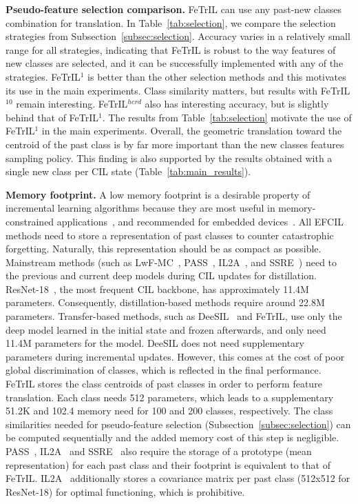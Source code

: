 \documentclass[10pt,twocolumn,letterpaper]{article}
\makeatletter
\newcommand{\ourmodel}{FeTrIL\@\xspace}
\newcommand{\ourmodelNospace}{FeTrIL}
\makeatother
\begin{document}
\textbf{Pseudo-feature selection comparison.}
\ourmodel can use any past-new classes combination for translation.
In Table~\ref{tab:selection}, we compare the selection strategies from Subsection~\ref{subsec:selection}.
Accuracy varies in a relatively small range for all strategies, indicating that \ourmodel is robust to the way features of new classes are selected, and it can be successfully implemented with any of the strategies. 
\ourmodelNospace$^{1}$ is better than the other selection methods and this motivates its use in the main experiments.
Class similarity matters, but results with \ourmodelNospace$^{10}$ remain interesting.
\ourmodelNospace$^{herd}$ also has interesting accuracy, but is slightly behind that of \ourmodelNospace$^{1}$.
The results from Table~\ref{tab:selection} motivate the use of \ourmodelNospace$^{1}$ in the main experiments.
Overall, the geometric translation toward the centroid of the past class is by far more important than the new classes features sampling policy.
This finding is also supported by the results obtained with a single new class per CIL state (Table~\ref{tab:main_results}).


\textbf{Memory footprint.} 
A low memory footprint is a desirable property of incremental learning algorithms because they are most useful in memory-constrained applications~\cite{masana2021_study,ravaglia2021tinyml,rebuffi2017_icarl}, and recommended for embedded devices~\cite{hayes2022online}.
All EFCIL methods need to store a representation of past classes to counter catastrophic forgetting. 
Naturally, this representation should be as compact as possible. 
Mainstream methods (such as LwF-MC~\cite{li2016_lwf}, PASS~\cite{zhu2021pass}, IL2A~\cite{zhu2021pass}, and SSRE~\cite{zhu2022self}) need to the previous and current deep models during CIL updates for distillation.
ResNet-18~\cite{he2016_resnet}, the most frequent CIL backbone, has approximately 11.4M parameters. 
Consequently, distillation-based methods require around 22.8M parameters.
Transfer-based methods, such as DeeSIL~\cite{belouadah2018_deesil} and \ourmodel, use only the deep model learned in the initial state and frozen afterwards, and only need 11.4M parameters for the model.
DeeSIL does not need supplementary parameters during incremental updates.
However, this comes at the cost of poor global discrimination of classes, which is reflected in the final performance. 
\ourmodel stores the class centroids of past classes in order to perform feature translation.
Each class needs 512 parameters, which leads to a supplementary 51.2K and 102.4 memory need for 100 and 200 classes, respectively.
The class similarities needed for pseudo-feature selection (Subsection~\ref{subsec:selection}) can be computed sequentially and the added memory cost of this step is negligible.
PASS~\cite{zhu2021pass}, IL2A~\cite{zhu2021class} and SSRE~\cite{zhu2022self} also require the storage of a prototype (mean representation) for each past class and their footprint is equivalent to that of \ourmodel. 
IL2A~\cite{zhu2021class} additionally stores a covariance matrix per past class (512x512 for ResNet-18) for optimal functioning, which is prohibitive. 
\end{document}

